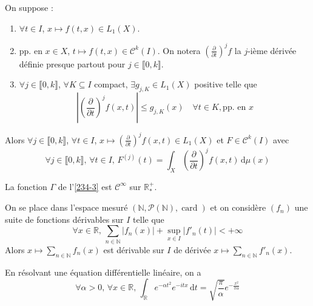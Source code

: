 	\begin{theorem}
		On suppose :
		\begin{enumerate}[label=(\roman*)]
			\item $\forall t \in I$, $x \mapsto f(t,x) \in L_1(X)$.
			\item pp. en $x \in X$, $t \mapsto f(t,x) \in \mathcal{C}^k(I)$. On notera $\left(\frac{\partial}{\partial t}\right)^j f$ la $j$-ième dérivée définie presque partout pour $j \in \llbracket 0, k \rrbracket$.
			\item $\forall j \in \llbracket 0, k \rrbracket$, $\forall K \subseteq I$ compact, $\exists g_{j,K} \in L_1(X)$ positive telle que
			\[ \left| \left(\frac{\partial}{\partial t}\right)^j f(x,t) \right| \leq g_{j,K}(x) \quad \forall t \in K, \text{pp. en } x \]
		\end{enumerate}
		Alors $\forall j \in \llbracket 0, k \rrbracket$, $\forall t \in I$, $x \mapsto \left(\frac{\partial}{\partial t}\right)^j f(x,t) \in L_1(X)$ et $F \in \mathcal{C}^k(I)$ avec
		\[ \forall j \in \llbracket 0, k \rrbracket, \, \forall t \in I, \, F^{(j)}(t) = \int_X \left(\frac{\partial}{\partial t}\right)^j f(x, t) \, \mathrm{d}\mu(x) \]
	\end{theorem}


	\begin{example}
		La fonction $\Gamma$ de l'\cref{234-3} est $\mathcal{C}^\infty$ sur $\mathbb{R}^+_*$.
	\end{example}


	\begin{example}
		On se place dans l'espace mesuré $(\mathbb{N}, \mathcal{P}(\mathbb{N}), \operatorname{card})$ et on considère $(f_n)$ une suite de fonctions dérivables sur $I$ telle que
		\[ \forall x \in \mathbb{R}, \, \sum_{n \in \mathbb{N}} |f_n(x)| + \sup_{x \in I} |f'_n(t)| < +\infty \]
		Alors $x \mapsto \sum_{n \in \mathbb{N}} f_n(x)$ est dérivable sur $I$ de dérivée $x \mapsto \sum_{n \in \mathbb{N}} f'_n(x)$.
	\end{example}


	\begin{application}
		En résolvant une équation différentielle linéaire, on a
		\[ \forall \alpha > 0, \, \forall x \in \mathbb{R}, \, \int_{\mathbb{R}} e^{-\alpha t^2} e^{-itx} \, \mathrm{d}t = \sqrt{\frac{\pi}{\alpha}} e^{-\frac{x^2}{\pi \alpha}} \]
	\end{application}

